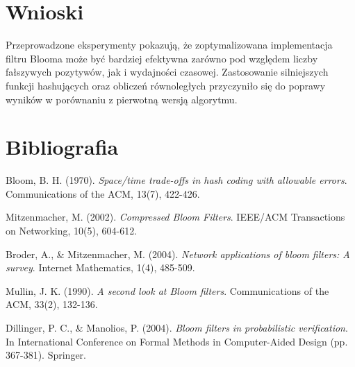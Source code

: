 \documentclass{article}
\begin{document}
\section{Wnioski}

Przeprowadzone eksperymenty pokazują, że zoptymalizowana implementacja filtru Blooma może być bardziej efektywna zarówno pod względem liczby fałszywych pozytywów, jak i wydajności czasowej. Zastosowanie silniejszych funkcji hashujących oraz obliczeń równoległych przyczyniło się do poprawy wyników w porównaniu z pierwotną wersją algorytmu.

\section{Bibliografia}

\begin{thebibliography}{9}

Bloom, B. H. (1970). \textit{Space/time trade-offs in hash coding with allowable errors}. Communications of the ACM, 13(7), 422-426.

Mitzenmacher, M. (2002). \textit{Compressed Bloom Filters}. IEEE/ACM Transactions on Networking, 10(5), 604-612.

Broder, A., \& Mitzenmacher, M. (2004). \textit{Network applications of bloom filters: A survey}. Internet Mathematics, 1(4), 485-509.

Mullin, J. K. (1990). \textit{A second look at Bloom filters}. Communications of the ACM, 33(2), 132-136.

Dillinger, P. C., \& Manolios, P. (2004). \textit{Bloom filters in probabilistic verification}. In International Conference on Formal Methods in Computer-Aided Design (pp. 367-381). Springer.

\end{thebibliography}
\end{document}
